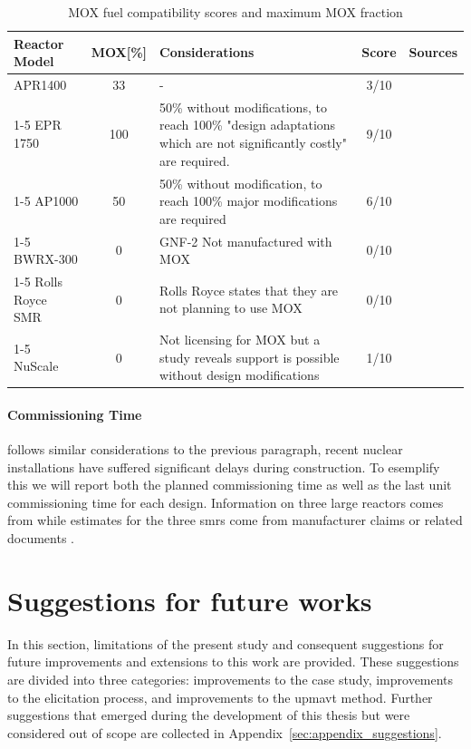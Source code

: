 \begin{table}[!hb]
    \centering
    \begin{tabularx}{\textwidth}{l c X c c}
        \toprule
        \textbf{Reactor Model} & \textbf{MOX[\%]} & \textbf{Considerations} & \textbf{Score} & Sources \\
        \midrule
        APR1400         & 33 & - & 3/10 & \cite{iaea2025aris} \\
        \cmidrule(lr){1-5}
        EPR 1750        & 100 & 50\% without modifications, to reach 100\% "design adaptations which are not significantly costly" are required.  & 9/10 & \cite{iaea2025aris, osti_22257897} \\
        \cmidrule(lr){1-5}
        AP1000          & 50 & 50\% without modification, to reach 100\% major modifications are required & 6/10 & \cite{iaea2025aris, FETTERMAN2009324} \\
        \cmidrule(lr){1-5}
        BWRX-300        & 0 & GNF-2 Not manufactured with MOX & 0/10 & \cite{CNSC_BWRX300_Fuel_Design} \\
        \cmidrule(lr){1-5}
        Rolls Royce SMR & 0 & Rolls Royce states that they are not planning to use MOX & 0/10 & \cite{RollsRoyce_SMR_GDA_Consultation} \\
        \cmidrule(lr){1-5}
        NuScale         & 0 & Not licensing for MOX but a study reveals support is possible without design modifications & 1/10 & \cite{NRC_ML17007A001, NuScale_MOX_2016} \\
        \bottomrule
    \end{tabularx}
    \caption{MOX fuel compatibility scores and maximum MOX fraction}
    \label{tab:mox-compatibility}
\end{table}


\paragraph{Commissioning Time} follows similar considerations to the previous paragraph, recent nuclear installations have suffered significant delays during construction. To esemplify this we will report both the planned commissioning time as well as the last unit commissioning time for each design. Information on three large reactors comes from \cite{nea2020unlocking} while estimates for the three \glspl{smr} come from manufacturer claims or related documents \cite{GEVernova_Nuclear_2025, RollsRoyce_SMR_Approach_2025, IEEFA_UAMPS_Talking_Points_2023}.


\section{Suggestions for future works}
\label{sec:suggestions}
In this section, limitations of the present study and consequent suggestions for future improvements and extensions to this work are provided. These suggestions are divided into three categories: improvements to the case study, improvements to the elicitation process, and improvements to the \gls{upmavt} method. Further suggestions that emerged during the development of this thesis but were considered out of scope are collected in Appendix~\ref{sec:appendix_suggestions}.

